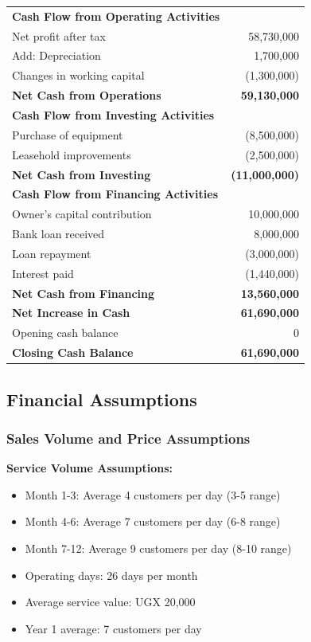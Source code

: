 \documentclass[a4paper,12pt]{article}
\begin{document}
\begin{tabular}{|l|r|}
\hline
\textbf{Cash Flow from Operating Activities} & \\
Net profit after tax & 58,730,000 \\
Add: Depreciation & 1,700,000 \\
Changes in working capital & (1,300,000) \\
\hline
\textbf{Net Cash from Operations} & \textbf{59,130,000} \\
\hline
\textbf{Cash Flow from Investing Activities} & \\
Purchase of equipment & (8,500,000) \\
Leasehold improvements & (2,500,000) \\
\hline
\textbf{Net Cash from Investing} & \textbf{(11,000,000)} \\
\hline
\textbf{Cash Flow from Financing Activities} & \\
Owner's capital contribution & 10,000,000 \\
Bank loan received & 8,000,000 \\
Loan repayment & (3,000,000) \\
Interest paid & (1,440,000) \\
\hline
\textbf{Net Cash from Financing} & \textbf{13,560,000} \\
\hline
\textbf{Net Increase in Cash} & \textbf{61,690,000} \\
Opening cash balance & 0 \\
\hline
\textbf{Closing Cash Balance} & \textbf{61,690,000} \\
\hline
\end{tabular}

\subsection{Financial Assumptions}

\subsubsection{Sales Volume and Price Assumptions}

\textbf{Service Volume Assumptions:}
\begin{itemize}[leftmargin=2em]
    \item Month 1-3: Average 4 customers per day (3-5 range)
    \item Month 4-6: Average 7 customers per day (6-8 range)
    \item Month 7-12: Average 9 customers per day (8-10 range)
    \item Operating days: 26 days per month
    \item Average service value: UGX 20,000
    \item Year 1 average: 7 customers per day
\end{itemize}
\end{document}
